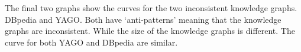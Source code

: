 \documentclass[11pt,letterpaper ,oneside ]{book}
\begin{document}
\begin{figure}[!t]
\end{figure}

	
	The final two graphs show the curves for the two inconsistent knowledge graphs. DBpedia and YAGO. Both have `anti-patterns' meaning that the knowledge graphs are inconsistent. While the size of the knowledge graphs is different. The curve for both YAGO and DBpedia are similar. 
	
\end{document}
